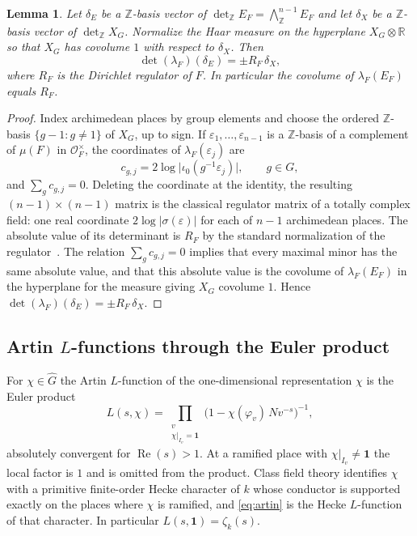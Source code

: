 \documentclass[11pt]{article}
\theoremstyle{plain}
\newtheorem{lemma}[theorem]{Lemma}
\theoremstyle{definition}
\theoremstyle{remark}
\newcommand{\Z}{\mathbb{Z}}
\newcommand{\R}{\mathbb{R}}
\newcommand{\OK}{\mathcal{O}}
\newcommand{\triv}{\mathbf{1}}
\begin{document}
\begin{lemma}
\label{lem:regulator}
Let $\delta_E$ be a $\Z$-basis vector of $\det_{\Z}E_F=\bigwedge^{n-1}_{\Z}E_F$ and let $\delta_X$ be a $\Z$-basis vector of $\det_{\Z}X_G$.
Normalize the Haar measure on the hyperplane $X_G\otimes\R$ so that $X_G$ has covolume $1$ with respect to $\delta_X$.
Then
\[
  \det(\lambda_F)(\delta_E)=\pm R_F\,\delta_X,
\]
where $R_F$ is the Dirichlet regulator of $F$.
In particular the covolume of $\lambda_F(E_F)$ equals $R_F$.
\end{lemma}

\begin{proof}
Index archimedean places by group elements and choose the ordered $\Z$-basis $\{g-1:g\neq 1\}$ of $X_G$, up to sign.
If $\varepsilon_1,\ldots,\varepsilon_{n-1}$ is a $\Z$-basis of a complement of $\mu(F)$ in $\OK_F^{\times}$, the coordinates of $\lambda_F(\varepsilon_j)$ are
\[
  c_{g,j}=2\log\bigl|\iota_0(g^{-1}\varepsilon_j)\bigr|,\qquad g\in G,
\]
and $\sum_g c_{g,j}=0$.
Deleting the coordinate at the identity, the resulting $(n-1)\times(n-1)$ matrix is the classical regulator matrix of a totally complex field: one real coordinate $2\log|\sigma(\varepsilon)|$ for each of $n-1$ archimedean places.
The absolute value of its determinant is $R_F$ by the standard normalization of the regulator~\cite[Chapter~I]{Neukirch}.
The relation $\sum_g c_{g,j}=0$ implies that every maximal minor has the same absolute value, and that this absolute value is the covolume of $\lambda_F(E_F)$ in the hyperplane for the measure giving $X_G$ covolume $1$.
Hence $\det(\lambda_F)(\delta_E)=\pm R_F\,\delta_X$.
\end{proof}

\subsection{Artin \texorpdfstring{$L$}{L}-functions through the Euler product}

For $\chi\in\widehat G$ the Artin $L$-function of the one-dimensional representation $\chi$ is the Euler product
\begin{equation}
\label{eq:artin}
  L(s,\chi)
  =\prod_{\substack{v\\ \chi|_{I_v}=\triv}}
    \bigl(1-\chi(\varphi_v)\,Nv^{-s}\bigr)^{-1},
\end{equation}
absolutely convergent for $\operatorname{Re}(s)>1$.
At a ramified place with $\chi|_{I_v}\neq\triv$ the local factor is $1$ and is omitted from the product.
Class field theory identifies $\chi$ with a primitive finite-order Hecke character of $k$ whose conductor is supported exactly on the places where $\chi$ is ramified, and \eqref{eq:artin} is the Hecke $L$-function of that character.
In particular $L(s,\triv)=\zeta_k(s)$.
\end{document}
